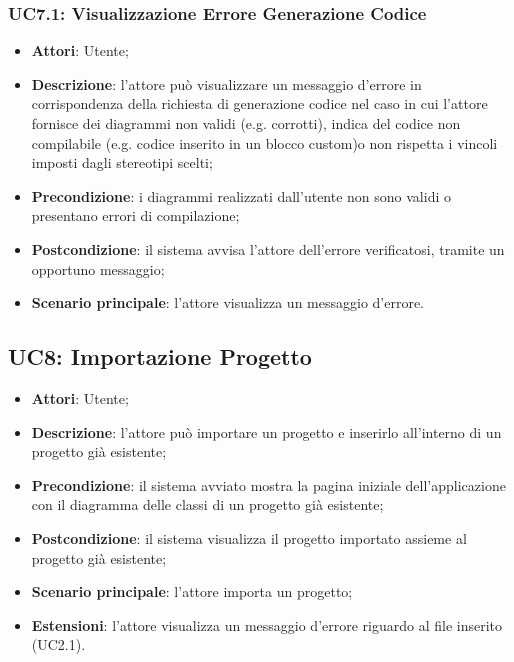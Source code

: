 \subsubsection{UC7.1: Visualizzazione Errore Generazione Codice}
\label{UC7.1}
\begin{itemize}
	\item \textbf{Attori}: Utente;
	\item \textbf{Descrizione}: l'attore può visualizzare un messaggio d'errore in corrispondenza della richiesta di generazione codice nel caso in cui l'attore fornisce dei diagrammi non validi (e.g. corrotti), indica del codice non compilabile (e.g. codice inserito in un blocco custom)o non rispetta i vincoli imposti dagli stereotipi scelti;
	\item \textbf{Precondizione}: i diagrammi realizzati dall'utente non sono validi o presentano errori di compilazione;%
	\item \textbf{Postcondizione}: il sistema avvisa l'attore dell'errore verificatosi, tramite un opportuno messaggio;
	\item \textbf{Scenario principale}: l'attore visualizza un messaggio d'errore.
\end{itemize}

\subsection{UC8: Importazione Progetto}
\label{UC8}
\begin{itemize}
	\item \textbf{Attori}: Utente;
	\item \textbf{Descrizione}: l'attore può importare un progetto e inserirlo all'interno di un progetto già esistente;
	\item \textbf{Precondizione}: il sistema avviato mostra la pagina iniziale dell'applicazione con il diagramma delle classi di un progetto già esistente;
	\item \textbf{Postcondizione}: il sistema visualizza il progetto importato assieme al progetto già esistente;
	\item \textbf{Scenario principale}: l'attore importa un progetto;
	\item \textbf{Estensioni}: l'attore visualizza un messaggio d'errore riguardo al file inserito (UC2.1).
\end{itemize}


